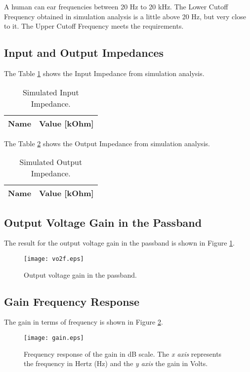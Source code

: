 A human can ear frequencies between 20 Hz to 20 kHz. The Lower Cutoff Frequency obtained in simulation analysis is a little above 20 Hz, but very close to it. The Upper Cutoff Frequency meets the requirements.

\subsection{Input and Output Impedances}

The Table \ref{tab:sim_zin} shows the Input Impedance from simulation analysis.

\begin{table}[H]
	\centering
	\begin{tabular}{|l|r|}
		\hline    
		{\bf Name} & {\bf Value [kOhm]} \\ \hline
		
	\end{tabular}
	\caption{Simulated Input Impedance.}
	\label{tab:sim_zin}
\end{table}

The Table \ref{tab:sim_zout} shows the Output Impedance from simulation analysis.

\begin{table}[H]
	\centering
	\begin{tabular}{|l|r|}
		\hline    
		{\bf Name} & {\bf Value [kOhm]} \\ \hline
		
	\end{tabular}
	\caption{Simulated Output Impedance.}
	\label{tab:sim_zout}
\end{table}


\subsection{Output Voltage Gain in the Passband}
The result for the output voltage gain in the passband is shown in Figure \ref{fig:gain_sim}.

\begin{figure}[H] \centering
	\texttt{[image: vo2f.eps]}
	\caption{Output voltage gain in the passband.}
	\label{fig:gain_sim}
\end{figure}

\pagebreak

\subsection{Gain Frequency Response}

The gain in terms of frequency is shown in Figure \ref{fig:teo_gaindB}.


\begin{figure}[H] \centering
	\texttt{[image: gain.eps]}
	\caption {Frequency response of the gain in dB scale. The \textit{x axis} represents the frequency in Hertz (Hz) and the \textit{y axis} the gain in Volts.}
	\label{fig:teo_gaindB}
\end{figure}





